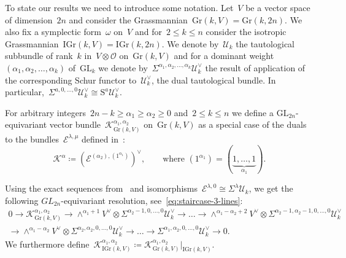 \documentclass[a4paper]{article}
\newcommand{\Gr}{\mathrm{Gr}}
\newcommand{\IGr}{\mathrm{IGr}}
\newcommand{\GL}{\mathrm{GL}}
\newcommand{\cE}{\mathcal{E}}
\newcommand{\cK}{\mathcal{K}}
\newcommand{\cU}{\mathcal{U}}
\newcommand{\cO}{\mathcal{O}}
\theoremstyle{remark}
\theoremstyle{definition}
\begin{document}
To state our results we need to introduce some notation.
Let~\(V\) be a vector space of dimension~\(2n\) and consider the Grassmannian~\(\Gr(k,V) = \Gr(k,2n)\).
We also fix a symplectic form~\(\omega\) on~\(V\) and for~\(2 \le k \le n\) 
consider the isotropic Grassmannian~\(\IGr(k,V) = \IGr(k,2n)\).
We denote by~\(\cU_k\) the tautological subbundle of rank~\(k\) in~\(V \otimes \cO\) on~\(\Gr(k,V)\)
and for a dominant weight~\((\alpha_1,\alpha_2,\dots,\alpha_k)\) of~\(\GL_k\) 
we denote by~\(\Sigma^{\alpha_1,\alpha_2,\dots,\alpha_k}\cU_k^\vee\) 
the result of application of the corresponding Schur functor to~\(\cU_k^\vee\), the dual tautological bundle. In particular,~\(\Sigma^{a,0,\dots,0}\cU_k^\vee \cong \mathrm{S}^a \cU_k^\vee\). 
 
For arbitrary integers~\(2n - k \ge \alpha_1 \ge \alpha_2 \ge 0\) and~\(2 \le k \le n\)
we define a \(\GL_{2n}\)-equivariant vector bundle~\(\cK_{\Gr(k,V)}^{\alpha_1,\alpha_2}\) on~\(\Gr(k,V)\) as a special case of the duals to the bundles~\(\cE^{\lambda,\mu}\) defined in~\cite[Section~3]{F15}:
\begin{equation}\label{eq:K=E*}
	\cK^{\alpha} \coloneqq \left(\cE^{(\alpha_2),(1^{\alpha_1})}\right)^\vee, \qquad 
	\text{where~\((1^{\alpha_1}) = (\underbrace{1, \dots, 1}_{\alpha_1})\).}
\end{equation}

Using the exact sequences from~\cite[Theorem~4.3]{F15} and isomorphisms~\(\cE^{\lambda,0} \cong \Sigma^\lambda \cU_k\), we get the following \(GL_{2n}\)-equivariant resolution, see~\eqref{eq:staircase-3-lines}:
\begin{multline}
	\label{eq:def-ckk}
	0 \to 
	\cK_{\Gr(k,V)}^{\alpha_1,\alpha_2} 
	\to \wedge^{\alpha_1+1} V^\vee \otimes \Sigma^{\alpha_2-1,0,\dots,0}\cU_k^\vee \to 
	\dots \to 
	\wedge^{\alpha_1-\alpha_2+2} V^\vee \otimes \Sigma^{\alpha_2-1,\alpha_2-1,0,\dots,0}\cU_k^\vee \\ \to 
	\wedge^{\alpha_1-\alpha_2} V^\vee \otimes \Sigma^{\alpha_2,\alpha_2,0,\dots,0}\cU_k^\vee \to 
	\dots \to
	\Sigma^{\alpha_1,\alpha_2,0,\dots,0}\cU_k^\vee \to 0.
\end{multline}
We furthermore define~\(\cK_{\IGr(k,V)}^{\alpha_1,\alpha_2} \coloneqq \cK_{\Gr(k,V)}^{\alpha_1,\alpha_2}\vert_{\IGr(k,V)}\).
\end{document}
